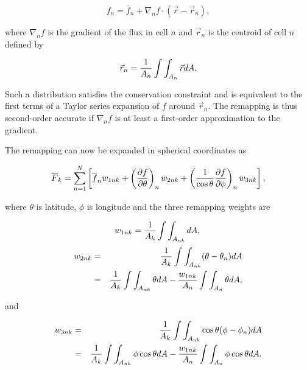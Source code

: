 \begin{description}
\begin{equation}\label{eq:gradient}
f_n = \overline{f}_n + 
                   \nabla_n f\cdot({\vec{r}} - \vec{r}_n),
\end{equation}

     where $\nabla_n f$ is the gradient of the flux in cell $n$ and $\vec{r}_n$
     is the centroid of cell $n$ defined by

 \begin{equation}\label{eq:centroid}
\vec{r}_n = {1\over{A_n}}\int\int_{A_n}\vec{r}dA.
\end{equation}

     Such a distribution satisfies the conservation constraint and is equivalent
     to the first terms of a Taylor series expansion of $f$ around $\vec{r}_n$.
     The remapping is thus second-order accurate if $\nabla_n f$ is at least a 
     first-order approximation to the gradient.

     The remapping can now be expanded in spherical coordinates as 

\begin{equation}\label{eq:remap}
\overline{F}_k = \sum_{n=1}^{N} \left[\overline{f}_n w_{1nk} + 
\left({{\partial f}\over{\partial \theta}}\right)_n w_{2nk} +
\left({1\over{\cos\theta}}{{\partial f}\over{\partial \phi}}\right)_n w_{3nk}
\right],
\end{equation}

     where $\theta$ is latitude, $\phi$ is longitude and the three remapping
     weights are

\begin{equation}\label{eq:weights1}
w_{1nk} = {1\over{A_k}}\int\int_{A_{nk}}dA, \\
\end{equation}
\begin{eqnarray}\label{eq:weights2}
w_{2nk} & = & {1\over{A_k}}\int\int_{A_{nk}}(\theta-\theta_n)dA \nonumber \\
        & = & {1\over{A_k}}\int\int_{A_{nk}}\theta dA -
              {{w_{1nk}}\over{A_n}}\int\int_{A_n}\theta dA,
\end{eqnarray}

     and

\begin{eqnarray}\label{eq:weights3}
w_{3nk} & = & {1\over{A_k}}\int\int_{A_{nk}}\cos\theta(\phi-\phi_n)dA \nonumber \\
        & = & {1\over{A_k}}\int\int_{A_{nk}}\phi\cos\theta dA -
              {{w_{1nk}}\over{A_n}}\int\int_{A_n}\phi\cos\theta dA .
\end{eqnarray}


\end{description}

